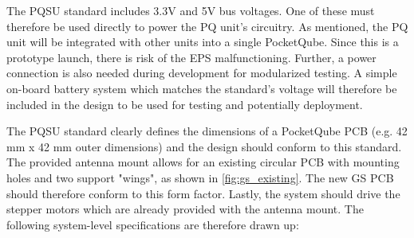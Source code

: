 The PQSU standard includes 3.3V and 5V bus voltages. One of these must therefore be used directly to power the PQ unit's circuitry. As mentioned, the PQ unit will be integrated with other units into a single PocketQube. Since this is a prototype launch, there is risk of the EPS malfunctioning. Further, a power connection is also needed during development for modularized testing. A simple on-board battery system which matches the standard's voltage will therefore be included in the design to be used for testing and potentially deployment.

The PQSU standard clearly defines the dimensions of a PocketQube PCB (e.g. 42 mm x 42 mm outer dimensions) and the design should conform to this standard. The provided antenna mount allows for an existing circular PCB with mounting holes and two support "wings", as shown in \ref{fig:gs_existing}. The new GS PCB should therefore conform to this form factor. Lastly, the system should drive the stepper motors which are already provided with the antenna mount. The following system-level specifications are therefore drawn up:
